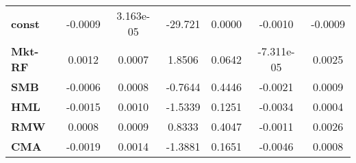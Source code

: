 \begin{center}
\begin{tabular}{lcccccc}
\midrule
\textbf{const}  &      -0.0009       &     3.163e-05      &     -29.721     &      0.0000      &      -0.0010      &      -0.0009       \\
\textbf{Mkt-RF} &       0.0012       &       0.0007       &      1.8506     &      0.0642      &     -7.311e-05    &       0.0025       \\
\textbf{SMB}    &      -0.0006       &       0.0008       &     -0.7644     &      0.4446      &      -0.0021      &       0.0009       \\
\textbf{HML}    &      -0.0015       &       0.0010       &     -1.5339     &      0.1251      &      -0.0034      &       0.0004       \\
\textbf{RMW}    &       0.0008       &       0.0009       &      0.8333     &      0.4047      &      -0.0011      &       0.0026       \\
\textbf{CMA}    &      -0.0019       &       0.0014       &     -1.3881     &      0.1651      &      -0.0046      &       0.0008       \\
\bottomrule
\end{tabular}
\end{center}

